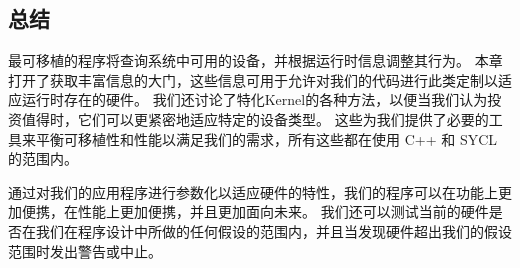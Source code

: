\subsection{总结}
最可移植的程序将查询系统中可用的设备，并根据运行时信息调整其行为。 
本章打开了获取丰富信息的大门，这些信息可用于允许对我们的代码进行此类定制以适应运行时存在的硬件。 
我们还讨论了特化Kernel的各种方法，以便当我们认为投资值得时，它们可以更紧密地适应特定的设备类型。 
这些为我们提供了必要的工具来平衡可移植性和性能以满足我们的需求，所有这些都在使用 C++ 和 SYCL 的范围内。

通过对我们的应用程序进行参数化以适应硬件的特性，我们的程序可以在功能上更加便携，在性能上更加便携，并且更加面向未来。 
我们还可以测试当前的硬件是否在我们在程序设计中所做的任何假设的范围内，并且当发现硬件超出我们的假设范围时发出警告或中止。